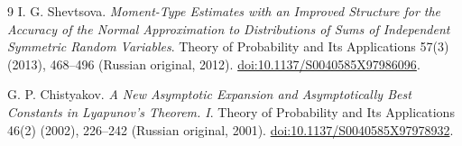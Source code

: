 \documentclass[11pt]{article}
\begin{document}
\begin{thebibliography}{9}
 I. G. Shevtsova.
\emph{Moment-Type Estimates with an Improved Structure for the Accuracy of the
Normal Approximation to Distributions of Sums of Independent Symmetric
Random Variables}.
Theory of Probability and Its Applications 57(3) (2013), 468--496
(Russian original, 2012).
\href{https://doi.org/10.1137/S0040585X97986096}{doi:10.1137/S0040585X97986096}.

 G. P. Chistyakov.
\emph{A New Asymptotic Expansion and Asymptotically Best Constants in
Lyapunov's Theorem. I}.
Theory of Probability and Its Applications 46(2) (2002), 226--242
(Russian original, 2001).
\href{https://doi.org/10.1137/S0040585X97978932}{doi:10.1137/S0040585X97978932}.
\end{thebibliography}
\end{document}
